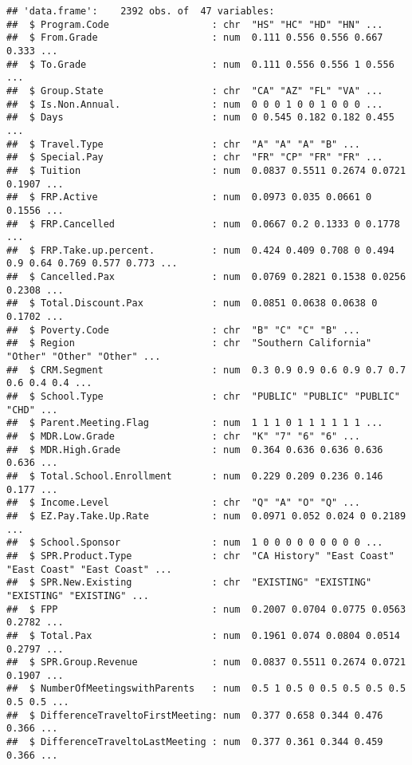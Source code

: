 \documentclass[
]{article}
\begin{document}
\begin{verbatim}
## 'data.frame':    2392 obs. of  47 variables:
##  $ Program.Code                  : chr  "HS" "HC" "HD" "HN" ...
##  $ From.Grade                    : num  0.111 0.556 0.556 0.667 0.333 ...
##  $ To.Grade                      : num  0.111 0.556 0.556 1 0.556 ...
##  $ Group.State                   : chr  "CA" "AZ" "FL" "VA" ...
##  $ Is.Non.Annual.                : num  0 0 0 1 0 0 1 0 0 0 ...
##  $ Days                          : num  0 0.545 0.182 0.182 0.455 ...
##  $ Travel.Type                   : chr  "A" "A" "A" "B" ...
##  $ Special.Pay                   : chr  "FR" "CP" "FR" "FR" ...
##  $ Tuition                       : num  0.0837 0.5511 0.2674 0.0721 0.1907 ...
##  $ FRP.Active                    : num  0.0973 0.035 0.0661 0 0.1556 ...
##  $ FRP.Cancelled                 : num  0.0667 0.2 0.1333 0 0.1778 ...
##  $ FRP.Take.up.percent.          : num  0.424 0.409 0.708 0 0.494 0.9 0.64 0.769 0.577 0.773 ...
##  $ Cancelled.Pax                 : num  0.0769 0.2821 0.1538 0.0256 0.2308 ...
##  $ Total.Discount.Pax            : num  0.0851 0.0638 0.0638 0 0.1702 ...
##  $ Poverty.Code                  : chr  "B" "C" "C" "B" ...
##  $ Region                        : chr  "Southern California" "Other" "Other" "Other" ...
##  $ CRM.Segment                   : num  0.3 0.9 0.9 0.6 0.9 0.7 0.7 0.6 0.4 0.4 ...
##  $ School.Type                   : chr  "PUBLIC" "PUBLIC" "PUBLIC" "CHD" ...
##  $ Parent.Meeting.Flag           : num  1 1 1 0 1 1 1 1 1 1 ...
##  $ MDR.Low.Grade                 : chr  "K" "7" "6" "6" ...
##  $ MDR.High.Grade                : num  0.364 0.636 0.636 0.636 0.636 ...
##  $ Total.School.Enrollment       : num  0.229 0.209 0.236 0.146 0.177 ...
##  $ Income.Level                  : chr  "Q" "A" "O" "Q" ...
##  $ EZ.Pay.Take.Up.Rate           : num  0.0971 0.052 0.024 0 0.2189 ...
##  $ School.Sponsor                : num  1 0 0 0 0 0 0 0 0 0 ...
##  $ SPR.Product.Type              : chr  "CA History" "East Coast" "East Coast" "East Coast" ...
##  $ SPR.New.Existing              : chr  "EXISTING" "EXISTING" "EXISTING" "EXISTING" ...
##  $ FPP                           : num  0.2007 0.0704 0.0775 0.0563 0.2782 ...
##  $ Total.Pax                     : num  0.1961 0.074 0.0804 0.0514 0.2797 ...
##  $ SPR.Group.Revenue             : num  0.0837 0.5511 0.2674 0.0721 0.1907 ...
##  $ NumberOfMeetingswithParents   : num  0.5 1 0.5 0 0.5 0.5 0.5 0.5 0.5 0.5 ...
##  $ DifferenceTraveltoFirstMeeting: num  0.377 0.658 0.344 0.476 0.366 ...
##  $ DifferenceTraveltoLastMeeting : num  0.377 0.361 0.344 0.459 0.366 ...

\end{verbatim}
\end{document}
